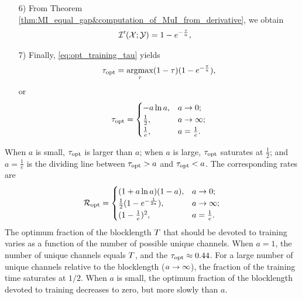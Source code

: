 \documentclass[12pt, draftclsnofoot,journal,onecolumn]{IEEEtran}
\begin{document}
\begin{itemize}
\item[6)]
From Theorem \ref{thm:MI_equal_gap&computation_of_MuI_from_derivative}, we obtain
\begin{align*}
    \mathcal{I}{'}({\mathcal{X}};{\mathcal{Y}}{})
    =&\;1-e^{-\frac{\tau}{a}},
\end{align*}
\item [7)]
Finally, \eqref{eq:opt_training_tau} yields \begin{equation}
    \tau_{{\rm opt}}=\mathop{\mathrm{argmax}}\limits_{\tau}(1-\tau)(1-e^{-\frac{\tau}{a}}),
    \label{eq:Ex5tauopt_def}
\end{equation}
or
\begin{equation*}
    \tau_{{\rm opt}}=\begin{cases} 
      -a\ln a, & a\to 0; \\
      \frac{1}{2}, & a\to\infty;\\
      \frac{1}{e}, & a=\frac{1}{e}.
      \end{cases}
\end{equation*}
\end{itemize}
When $a$ is small, $\tau_{{\rm opt}}$ is larger than $a$; when $a$ is large, $\tau_{{\rm opt}}$ saturates at $\frac{1}{2}$; and $a=\frac{1}{e}$ is the dividing line between $\tau_{{\rm opt}}>a$ and $\tau_{{\rm opt}}<a$.  The corresponding rates are
\begin{equation*}
    \mathcal{R}_{\rm opt}=\begin{cases} 
      (1+a\ln a)(1-a), & a\to 0; \\
      \frac{1}{2}(1-e^{-\frac{1}{2a}}), & a\to\infty;\\
      (1-\frac{1}{e})^2, & a=\frac{1}{e}.
      \end{cases}
\end{equation*}
The optimum fraction of the blocklength $T$ that should be devoted to training varies as a function of the number of possible unique channels.  When $a=1$, the number of unique channels equals $T$, and the $\tau_{{\rm opt}}\approx 0.44$.  For a large number of unique channels relative to the blocklength ($a\rightarrow\infty$), the fraction of the training time saturates at $1/2$.  When $a$ is small, the optimum fraction of the blocklength devoted to training decreases to zero, but more slowly than $a$.
\end{document}

